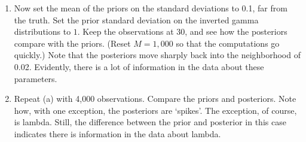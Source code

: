 \documentclass[12pt,thmsa]{article}
\begin{document}
\begin{enumerate}
\begin{enumerate}
\item Now set the mean of the priors on the standard deviations to 0.1, far
from the truth. Set the prior standard deviation on the inverted gamma
distributions to $1$. Keep the observations at 30, and see how the
posteriors compare with the priors. (Reset $M=1,000$ so that the
computations go quickly.) Note that the posteriors move sharply back into
the neighborhood of 0.02. Evidently, there is a lot of information in the
data about these parameters.

\item Repeat (a) with 4,000 observations. Compare the priors and posteriors.
Note how, with one exception, the posteriors are `spikes'. The exception, of
course, is lambda. Still, the difference between the prior and posterior in
this case indicates there is information in the data about lambda.
\end{enumerate}


\end{enumerate}
\end{document}

